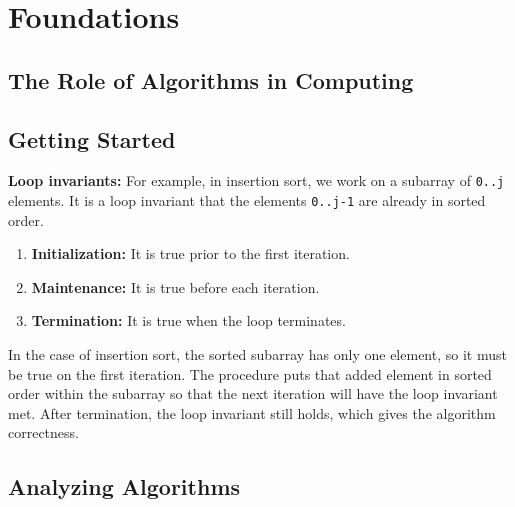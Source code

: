 \documentclass[12pt]{article}
\begin{document}
\section{Foundations}

\subsection{The Role of Algorithms in Computing}

\subsection{Getting Started}
\textbf{Loop invariants:} For example, in insertion sort, we work on a subarray of \texttt{0..j} elements. It is a loop invariant that the elements \texttt{0..j-1} are already in sorted order.
\begin{enumerate}
    \item \textbf{Initialization:} It is true prior to the first iteration.
    \item \textbf{Maintenance:} It is true before each iteration.
    \item \textbf{Termination:} It is true when the loop terminates.
\end{enumerate}
In the case of insertion sort, the sorted subarray has only one element, so it must be true on the first iteration. The procedure puts that added element in sorted order within the subarray so that the next iteration will have the loop invariant met. After termination, the loop invariant still holds, which gives the algorithm correctness.

\subsection{Analyzing Algorithms}
\end{document}
